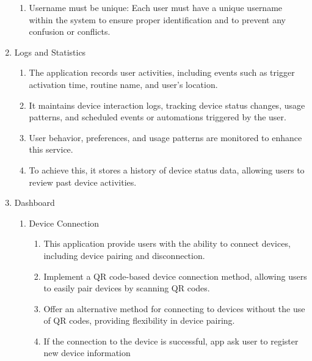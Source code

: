 \begin{enumerate}[label=\arabic*.]
\begin{enumerate}[label*={\arabic*.},ref=\theenumi.\arabic*]
              \item Username must be unique: Each user must have a unique username within the system to ensure proper identification and to prevent any confusion or conflicts.\\
          \end{enumerate}

    \item {\large{Logs and Statistics}}\\
          \begin{enumerate}[label*={\arabic*.},ref=\theenumi.\arabic*]
              \setlength{\itemindent}{0.5cm}
              \item The application records user activities, including events such as trigger activation time, routine name, and user's location. \\

              \item It maintains device interaction logs, tracking device status changes, usage patterns, and scheduled events or automations triggered by the user. \\


              \item User behavior, preferences, and usage patterns are monitored to enhance this service. \\

              \item To achieve this, it stores a history of device status data, allowing users to review past device activities.\\
          \end{enumerate}


    \item {\large{Dashboard}}\\
          \begin{enumerate}[label*={\arabic*.}]
              \item {\large{Device Connection}}\\
                    \begin{enumerate}[label*={\arabic*.},ref=\theenumi.\arabic*]
                        \setlength{\itemindent}{0.5cm}
                        \item This application provide users with the ability to connect devices, including device pairing and disconnection.\\
                        \item Implement a QR code-based device connection method, allowing users to easily pair devices by scanning QR codes.\\
                        \item Offer an alternative method for connecting to devices without the use of QR codes, providing flexibility in device pairing.\\
                        \item If the connection to the device is successful, app ask user to register new device information\\
                    \end{enumerate}


\end{enumerate}
\end{enumerate}
